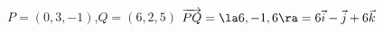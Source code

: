 {$P=(0,3,-1)$,\quad $Q = (6,2,5)$
}
{$\overrightarrow{PQ} = \la 6,-1,6\ra = 6\vec i -\vec j+6\vec k$
}
